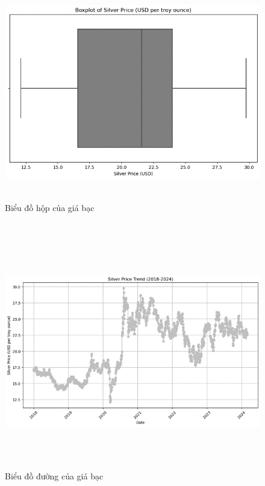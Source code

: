 \documentclass[conference]{IEEEtran}
\begin{document}
\begin{figure}[H]
    \centering
    \begin{minipage}{0.23\textwidth}
    \centering
    \includegraphics[width=1\textwidth]{bibliography/Figure/boxplot_silver.png}
    \caption{Biểu đồ hộp của giá bạc}
    \label{fig:3}
    \end{minipage}
    \hfill
    \begin{minipage}{0.23\textwidth}
    \centering
    \includegraphics[width=1\textwidth]{bibliography/Figure/line_silver.png}
    \caption{Biểu đồ đường của giá bạc}
    \label{fig:4}
    \end{minipage}
\end{figure} 
\end{document}
